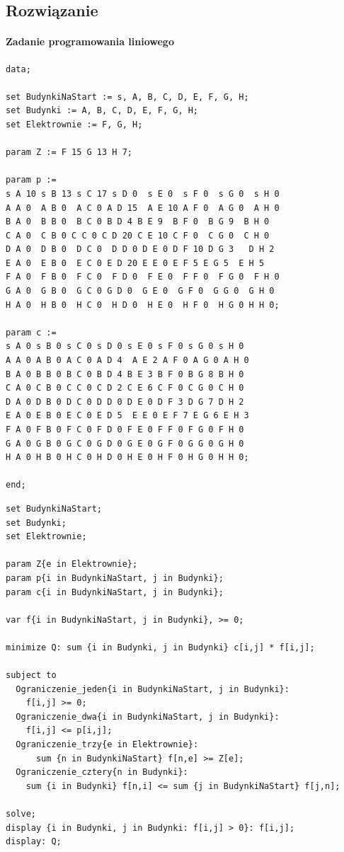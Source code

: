 \subsection{Rozwiązanie}
\paragraph{Zadanie programowania liniowego}

\begin{lstlisting}[caption= plik dat]
data; 
 
set BudynkiNaStart := s, A, B, C, D, E, F, G, H; 
set Budynki := A, B, C, D, E, F, G, H; 
set Elektrownie := F, G, H; 

param Z := F 15 G 13 H 7; 
 
param p := 
s A 10 s B 13 s C 17 s D 0  s E 0  s F 0  s G 0  s H 0
A A 0  A B 0  A C 0 A D 15  A E 10 A F 0  A G 0  A H 0
B A 0  B B 0  B C 0 B D 4 B E 9  B F 0  B G 9  B H 0
C A 0  C B 0 C C 0 C D 20 C E 10 C F 0  C G 0  C H 0   
D A 0  D B 0  D C 0  D D 0 D E 0 D F 10 D G 3   D H 2 
E A 0  E B 0  E C 0 E D 20 E E 0 E F 5 E G 5  E H 5  
F A 0  F B 0  F C 0  F D 0  F E 0  F F 0  F G 0  F H 0
G A 0  G B 0  G C 0 G D 0  G E 0  G F 0  G G 0  G H 0
H A 0  H B 0  H C 0  H D 0  H E 0  H F 0  H G 0 H H 0; 
 
param c := 
s A 0 s B 0 s C 0 s D 0 s E 0 s F 0 s G 0 s H 0
A A 0 A B 0 A C 0 A D 4  A E 2 A F 0 A G 0 A H 0
B A 0 B B 0 B C 0 B D 4 B E 3 B F 0 B G 8 B H 0
C A 0 C B 0 C C 0 C D 2 C E 6 C F 0 C G 0 C H 0   
D A 0 D B 0 D C 0 D D 0 D E 0 D F 3 D G 7 D H 2
E A 0 E B 0 E C 0 E D 5  E E 0 E F 7 E G 6 E H 3 
F A 0 F B 0 F C 0 F D 0 F E 0 F F 0 F G 0 F H 0
G A 0 G B 0 G C 0 G D 0 G E 0 G F 0 G G 0 G H 0
H A 0 H B 0 H C 0 H D 0 H E 0 H F 0 H G 0 H H 0; 

end; 
\end{lstlisting}
\begin{lstlisting}[caption= plik mod]
set BudynkiNaStart; 
set Budynki; 
set Elektrownie; 

param Z{e in Elektrownie}; 
param p{i in BudynkiNaStart, j in Budynki}; 
param c{i in BudynkiNaStart, j in Budynki}; 

var f{i in BudynkiNaStart, j in Budynki}, >= 0; 
 
minimize Q: sum {i in Budynki, j in Budynki} c[i,j] * f[i,j]; 
 
subject to 
  Ograniczenie_jeden{i in BudynkiNaStart, j in Budynki}: 
    f[i,j] >= 0; 
  Ograniczenie_dwa{i in BudynkiNaStart, j in Budynki}: 
    f[i,j] <= p[i,j]; 
  Ograniczenie_trzy{e in Elektrownie}: 
      sum {n in BudynkiNaStart} f[n,e] >= Z[e]; 
  Ograniczenie_cztery{n in Budynki}: 
    sum {i in Budynki} f[n,i] <= sum {j in BudynkiNaStart} f[j,n]; 
 
solve; 
display {i in Budynki, j in Budynki: f[i,j] > 0}: f[i,j]; 
display: Q;
\end{lstlisting}
